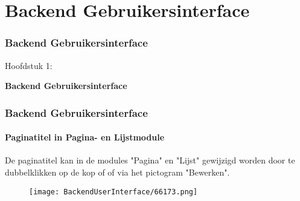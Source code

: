 %

\section{Backend Gebruikersinterface}
\begin{frame}[fragile]
	\frametitle{Backend Gebruikersinterface	}

	\begin{center}\huge{Hoofdstuk 1:}\end{center}
	\begin{center}\huge{\color{typo3darkgrey}\textbf{Backend Gebruikersinterface}}\end{center}

\end{frame}

\begin{frame}[fragile]
	\frametitle{Backend Gebruikersinterface}
	\framesubtitle{Paginatitel in Pagina- en Lijstmodule}

	De paginatitel kan in de modules "Pagina" en "Lijst" gewijzigd worden door te dubbelklikken op de kop of
	of via het pictogram "Bewerken".

	\begin{figure}
		\texttt{[image: BackendUserInterface/66173.png]}
	\end{figure}

\end{frame}

